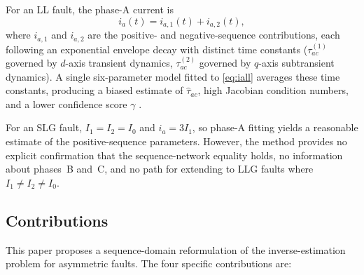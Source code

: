 \documentclass[10pt,journal,twoside]{IEEEtran}
\begin{document}
For an LL fault, the phase-A current is
\begin{equation}
i_a(t) = i_{a,1}(t) + i_{a,2}(t),
\label{eq:iall}
\end{equation}
where $i_{a,1}$ and $i_{a,2}$ are the positive- and negative-sequence
contributions, each following an exponential envelope decay with distinct
time constants ($\tau_{ac}^{(1)}$ governed by $d$-axis transient dynamics,
$\tau_{ac}^{(2)}$ governed by $q$-axis subtransient dynamics).
A single six-parameter model fitted to \eqref{eq:iall} averages these
time constants, producing a biased estimate of $\hat{\tau}_{ac}$, high
Jacobian condition numbers, and a lower confidence score $\gamma$
\cite{Eluvathingal2026_TR02}.

For an SLG fault, $I_1 = I_2 = I_0$ and $i_a = 3I_1$, so phase-A fitting
yields a reasonable estimate of the positive-sequence parameters.  However,
the method provides no explicit confirmation that the sequence-network
equality holds, no information about phases~B and~C, and no path for
extending to LLG faults where $I_1 \neq I_2 \neq I_0$.

\subsection{Contributions}

This paper proposes a sequence-domain reformulation of the inverse-estimation
problem for asymmetric faults.  The four specific contributions are:
\end{document}
